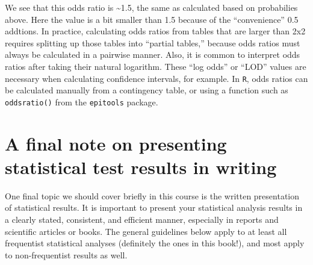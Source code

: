 \documentclass[]{book}
\begin{document}
We see that this odds ratio is \textasciitilde{}1.5, the same as calculated based on probabilies above. Here the value is a bit smaller than 1.5 because of the ``convenience'' 0.5 addtions. In practice, calculating odds ratios from tables that are larger than 2x2 requires splitting up those tables into ``partial tables,'' because odds ratios must always be calculated in a pairwise manner. Also, it is common to interpret odds ratios after taking their natural logarithm. These ``log odds'' or ``LOD'' values are necessary when calculating confidence intervals, for example. In \texttt{R}, odds ratios can be calculated manually from a contingency table, or using a function such as \texttt{oddsratio()} from the \texttt{epitools} package.

\hypertarget{a-final-note-on-presenting-statistical-test-results-in-writing}{%
\section{A final note on presenting statistical test results in writing}\label{a-final-note-on-presenting-statistical-test-results-in-writing}}

One final topic we should cover briefly in this course is the written presentation of statistical results. It is important to present your statistical analysis results in a clearly stated, consistent, and efficient manner, especially in reports and scientific articles or books. The general guidelines below apply to at least all frequentist statistical analyses (definitely the ones in this book!), and most apply to non-frequentist results as well.
\end{document}
